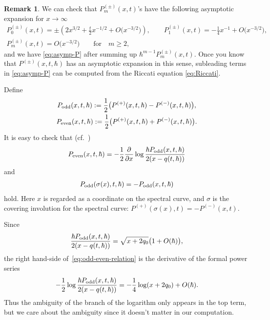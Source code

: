 \documentclass[pdftex]{sigma}
\theoremstyle{definition}
\newtheorem{rem}[thm]{Remark}
\numberwithin{equation}{section}
\def\p{\partial}
\begin{document}
\begin{rem} \label{rem:asymptotics}
We can check that $P^{(\pm)}_{m}(x,t)$'s
have the following asymptotic expansion for \mbox{$x \rightarrow \infty$}
\begin{gather*}
P^{(\pm)}_{0}(x,t)   =   \pm \left( 2x^{3/2} + \frac{t}{2}x^{-1/2}
+ O\big(x^{-3/2}\big) \right), \qquad
P^{(\pm)}_{1}(x,t)  =   -\frac{1}{4}x^{-1} + O\big(x^{-3/2}\big), \\
P^{(\pm)}_{m}(x,t)   =    O\big(x^{-3/2}\big) \qquad \text{for} \quad m \ge 2,
\end{gather*}
and we have \eqref{eq:asymp-P} after summing up
$\hbar^{m-1}P^{(\pm)}_{m}(x,t)$. Once you know that $P^{(\pm)}(x,t,\hbar)$
has an asymptotic expansion in this sense, subleading terms in
\eqref{eq:asymp-P} can be computed from
the Riccati equation \eqref{eq:Riccati}.
\end{rem}

Def\/ine
\begin{gather*}
P_{\rm odd}(x,t,\hbar)   :=   \frac{1}{2}
\big( P^{(+)}(x,t,\hbar) - P^{(-)}(x,t,\hbar) \big), \\
P_{\rm even}(x,t,\hbar)   :=   \frac{1}{2}
\big( P^{(+)}(x,t,\hbar) + P^{(-)}(x,t,\hbar) \big).
\end{gather*}
It is easy to check that (cf.~\cite[Section~2]{KT05})
\begin{gather} \label{eq:odd-even-relation}
P_{\rm even}(x,t,\hbar) =
-\frac{1}{2}\frac{\p}{\p x}
\log \frac{ \hbar P_{\rm odd}(x,t,\hbar)}
{2(x-q(t,\hbar))}
\end{gather}
and
\begin{gather} \label{eq:parity}
P_{\rm odd}(\sigma(x),t,\hbar) = - P_{\rm odd}(x,t,\hbar)
\end{gather}
hold. Here $x$ is regarded as a coordinate on the spectral curve,
and $\sigma$ is the covering involution for the spectral curve:
$P^{(+)}(\sigma(x),t) = - P^{(-)}(x,t)$.

Since
\begin{gather*}
\frac{ \hbar P_{\rm odd}(x,t,\hbar)}{2(x-q(t,\hbar))} =
\sqrt{x+2q_{0}} \big( 1 + O(\hbar) \big),
\end{gather*}
the right hand-side of~\eqref{eq:odd-even-relation}
is the derivative of the formal power series
\begin{gather*}
-\frac{1}{2}\log\frac{ \hbar P_{\rm odd}(x,t,\hbar)}{2(x-q(t,\hbar))} =
-\frac{1}{4}\log(x+2q_{0}) + O(\hbar).
\end{gather*}
Thus the ambiguity of the branch of the logarithm
only appears in the top term, but
we care about the ambiguity since
it doesn't matter in our computation.
\end{document}
